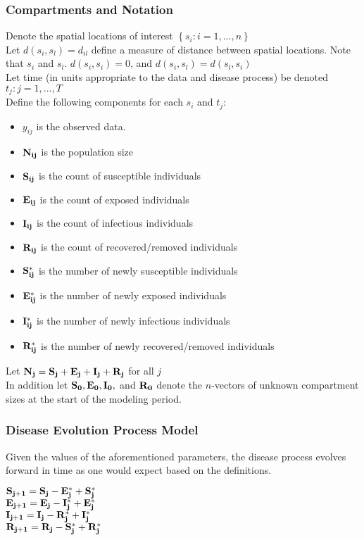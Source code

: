 \documentclass[12pt]{article}
\newcommand \mbreak {\\ \vspace{0.1in}}
\begin{document}
    \subsubsection{Compartments and Notation}
        Denote the spatial locations of interest $\left\{s_i : i = 1, ...,n \right\}$ \mbreak
        Let $d(s_i, s_l) = d_{il}$ define a measure of distance between 
        spatial locations. Note that $s_i$ and $s_l$. $d(s_i, s_i) = 0$, and $d(s_i, s_l) = d(s_l, s_i)$ \mbreak
        Let time (in units appropriate to the data and disease process) be denoted ${t_j : j = 1, ...,T}$ \mbreak
        Define the following components for each $s_i$ and $t_j$: \mbreak

        \begin{itemize}
            \item {$y_{ij}$} is the observed data.
            \item {$\bf{N_{ij}}$} is the population size
            \item {$\bf{S_{ij}}$} is the count of susceptible individuals
            \item {$\bf{E_{ij}}$} is the count of exposed individuals
            \item {$\bf{I_{ij}}$} is the count of infectious individuals
            \item {$\bf{R_{ij}}$} is the count of recovered/removed individuals
            \item {$\bf{S^*_{ij}}$} is the number of newly susceptible individuals
            \item {$\bf{E^*_{ij}}$} is the number of newly exposed individuals
            \item {$\bf{I^*_{ij}}$} is the number of newly infectious individuals
            \item {$\bf{R^*_{ij}}$} is the number of newly recovered/removed individuals
        \end{itemize}
        Let {$\bf{N_j} = \bf{S_j + E_j + I_j + R_j}$} for all $j$\\
        In addition let ${\bf{S_0, E_0, I_0,}}$ and ${\bf{R_0}}$ denote the $n$-vectors of unknown compartment sizes at the 
        start of the modeling period. 
        

    \subsubsection{Disease Evolution Process Model}
    Given the values of the aforementioned parameters, the disease process evolves forward in time 
    as one would expect based on the definitions.  
    \begin{center}
        $\bf{S_{j+1}} = \bf{S_j} - \bf{E_j^*} + \bf{S_j^*}$\mbreak
        $\bf{E_{j+1}} = \bf{E_j} - \bf{I_j^*} + \bf{E_j^*}$\mbreak
        $\bf{I_{j+1}} = \bf{I_j} - \bf{R_j^*} + \bf{I_j^*}$\mbreak
        $\bf{R_{j+1}} = \bf{R_j} - \bf{S_j^*} + \bf{R_j^*}$\mbreak
    \end{center}
    \vspace{0.15in}
\end{document}
